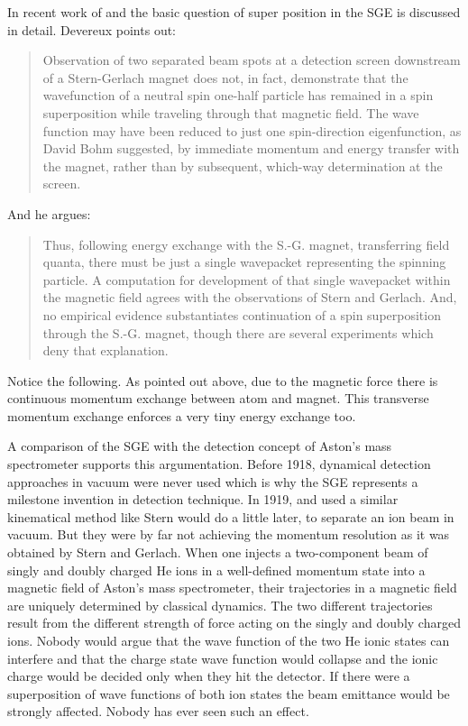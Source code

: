 \documentclass{article}
\begin{document}
In recent work of \cite{DevereuxM2015Reduction} and \cite{WennerstroemHEtal2012experiment,WennerstroemHEtal2013measurements,WennerstroemHEtal2014Interpretation} the basic question of super position in the SGE is discussed in detail. Devereux points out: 
\begin{quote}
Observation of two separated beam spots at a detection screen downstream of a Stern-Gerlach magnet does not, in fact, demonstrate that the wavefunction of a neutral spin one-half particle has remained in a spin superposition while traveling through that magnetic field. The wave function may have been reduced to just one spin-direction eigenfunction, as David Bohm suggested, by immediate momentum and energy transfer with the magnet, rather than by subsequent, which-way determination at the screen. 
\end{quote}
And he argues:
\begin{quote}
Thus, following energy exchange with the S.-G. magnet, transferring field quanta, there must be just a single wavepacket representing the spinning particle.  A computation for development of that single wavepacket within the magnetic field agrees with the observations of Stern and Gerlach. And, no empirical evidence substantiates continuation of a spin superposition through the S.-G. magnet, though there are several experiments which deny that explanation. 
\end{quote}
Notice the following. As pointed out above, due to the magnetic force there is continuous momentum exchange between atom and magnet. This transverse momentum exchange enforces a very tiny energy exchange too.

A comparison of the SGE with the detection concept of Aston's mass spectrometer supports this argumentation. Before 1918, dynamical detection approaches in vacuum were never used which is why the SGE represents a milestone invention in detection technique. In 1919, \cite{DempsterAJ1918Method} and \cite{AstonF1919Spectrograph} used a similar kinematical method like Stern would do a little later, to separate an ion beam in vacuum. But they were by far not achieving the momentum resolution as it was obtained by Stern and Gerlach. When one injects a two-component beam of singly and doubly charged He ions in a well-defined momentum state into a magnetic field of Aston's mass spectrometer, their trajectories in a magnetic field are uniquely determined by classical dynamics. The two different trajectories result from the different strength of force acting on the singly and doubly charged ions. Nobody would argue that the wave function of the two He ionic states can interfere and that the charge state wave function would collapse and the ionic charge would be decided only when they hit the detector. If there were a superposition of wave functions of both ion states the beam emittance would be strongly affected. Nobody has ever seen such an effect. 
\end{document}
